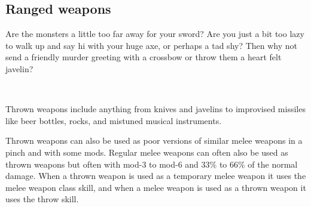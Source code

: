 \subsection*{Ranged weapons}

Are the monsters a little too far away for your sword? Are you just a bit too lazy to walk up and say hi with your huge axe, or perhaps a tad shy? Then why not send a friendly murder greeting with a crossbow or throw them a heart felt javelin?

\

\noindent Thrown weapons include anything from knives and javelins to improvised missiles like beer bottles, rocks, and mistuned musical instruments.

Thrown weapons can also be used as poor versions of similar melee weapons in a pinch and with some mods. Regular melee weapons can often also be used as thrown weapons but often with mod-3 to mod-6 and 33\% to 66\% of the normal damage. When a thrown weapon is used as a temporary melee weapon it uses the melee weapon class skill, and when a melee weapon is used as a thrown weapon it uses the throw skill.

\

